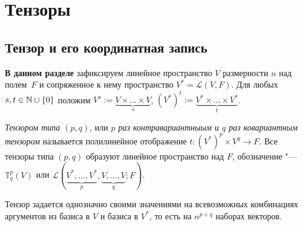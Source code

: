 \section{Тензоры}

\subsection{Тензор и его координатная запись}

\textbf{В данном разделе} зафиксируем линейное пространство $V$ размерности $n$ над полем~$F$ и сопряженное к нему пространство $V^* = \mathcal{L}(V, F)$. Для любых $s, t \in \mathbb{N} \cup \{0\}$ положим $V^s := \underbrace{V \times \dots \times V}_{s}$, $(V^*)^t := \underbrace{V^* \times \dots \times V^*}_{t}$.

\begin{definition}
	\textit{Тензором типа $(p, q)$}, или \textit{$p$ раз контравариантныым и $q$ раз ковариантным тензором} называется полилинейное отображение $t: (V^*)^p \times V^q \rightarrow F$. Все тензоры типа $(p, q)$ образуют линейное пространство над $F$, обозначение "--- $\mathbb{T}^p_q(V)$ или $\mathcal{L}(\underbrace{V^*, \dots, V^*}_{p}, \underbrace{V, \dots, V}_{q}; F)$.
\end{definition}

\begin{note}
	Тензор задается однозначно своими значениями на всевозможных комбинациях аргументов из базиса в $V$ и базиса в $V^*$, то есть на $n^{p + q}$ наборах векторов.
\end{note}

